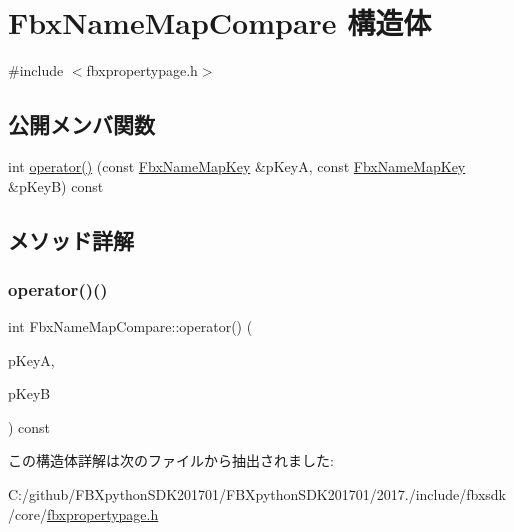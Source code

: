 \hypertarget{struct_fbx_name_map_compare}{}\section{Fbx\+Name\+Map\+Compare 構造体}
\label{struct_fbx_name_map_compare}


{\ttfamily \#include $<$fbxpropertypage.\+h$>$}

\subsection*{公開メンバ関数}
\begin{DoxyCompactItemize}
\item 
int \hyperlink{struct_fbx_name_map_compare_a9c6332a9e8c2690ccb2ed5546649de86}{operator()} (const \hyperlink{fbxpropertypage_8h_a15e637bebd0ff80c69b74c533323c930}{Fbx\+Name\+Map\+Key} \&p\+KeyA, const \hyperlink{fbxpropertypage_8h_a15e637bebd0ff80c69b74c533323c930}{Fbx\+Name\+Map\+Key} \&p\+KeyB) const
\end{DoxyCompactItemize}


\subsection{メソッド詳解}
\mbox{\label{struct_fbx_name_map_compare_a9c6332a9e8c2690ccb2ed5546649de86}} 
\subsubsection{\texorpdfstring{operator()()}{operator()()}}
{\footnotesize\ttfamily int Fbx\+Name\+Map\+Compare\+::operator() (\begin{DoxyParamCaption}\item[{const \hyperlink{fbxpropertypage_8h_a15e637bebd0ff80c69b74c533323c930}{Fbx\+Name\+Map\+Key} \&}]{p\+KeyA,  }\item[{const \hyperlink{fbxpropertypage_8h_a15e637bebd0ff80c69b74c533323c930}{Fbx\+Name\+Map\+Key} \&}]{p\+KeyB }\end{DoxyParamCaption}) const}



この構造体詳解は次のファイルから抽出されました\+:\begin{DoxyCompactItemize}
\item 
C\+:/github/\+F\+B\+Xpython\+S\+D\+K201701/\+F\+B\+Xpython\+S\+D\+K201701/2017./include/fbxsdk/core/\hyperlink{fbxpropertypage_8h}{fbxpropertypage.\+h}\end{DoxyCompactItemize}
